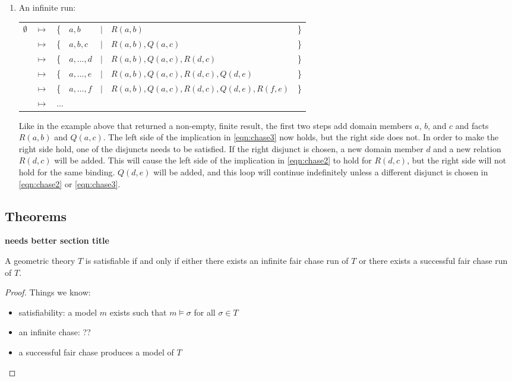 \begin{enumerate}
		\item An infinite run:

			\begin{tabular}{lllllll}
				$\emptyset$ & $\mapsto$ & \{ & $a,b$        & $|$ & $R(a,b)$                                 & \} \\
				{}          & $\mapsto$ & \{ & $a,b,c$      & $|$ & $R(a,b), Q(a,c)$                         & \} \\
				{}          & $\mapsto$ & \{ & $a,\ldots,d$ & $|$ & $R(a,b), Q(a,c), R(d,c)$                 & \} \\
				{}          & $\mapsto$ & \{ & $a,\ldots,e$ & $|$ & $R(a,b), Q(a,c), R(d,c), Q(d,e)$         & \} \\
				{}          & $\mapsto$ & \{ & $a,\ldots,f$ & $|$ & $R(a,b), Q(a,c), R(d,c), Q(d,e), R(f,e)$ & \} \\
				{}          & $\mapsto$ & \multicolumn{5}{l}{ $\ldots$ }
			\end{tabular}

			Like in the example above that returned a non-empty, finite result,
			the first two steps add domain members $a$, $b$, and $c$ and facts
			$R(a,b)$ and $Q(a,c)$. The left side of the implication in
			\eqref{eqn:chase3} now holds, but the right side does not. In order
			to make the right side hold, one of the disjuncts needs to be
			satisfied. If the right disjunct is chosen, a new domain member $d$
			and a new relation $R(d,c)$ will be added. This will cause the left
			side of the implication in \eqref{eqn:chase2} to hold for $R(d,c)$,
			but the right side will not hold for the same binding. $Q(d,e)$
			will be added, and this loop will continue indefinitely unless a
			different disjunct is chosen in \eqref{eqn:chase2} or
			\eqref{eqn:chase3}.

		\end{enumerate}

	\subsection{Theorems}

		\textbf{ needs better section title }

		\begin{theorem}
			A geometric theory $T$ is satisfiable if and only if either there
			exists an infinite fair chase run of $T$ or there exists a
			successful fair chase run of $T$.
		\end{theorem}

		\begin{proof}
			Things we know:
			\begin{itemize}
			\item satisfiability: a model $m$ exists such that $m \models \sigma$ for all $\sigma \in T$
			\item an infinite chase: ??
			\item a successful fair chase produces a model of $T$
			\end{itemize}
		\end{proof}

